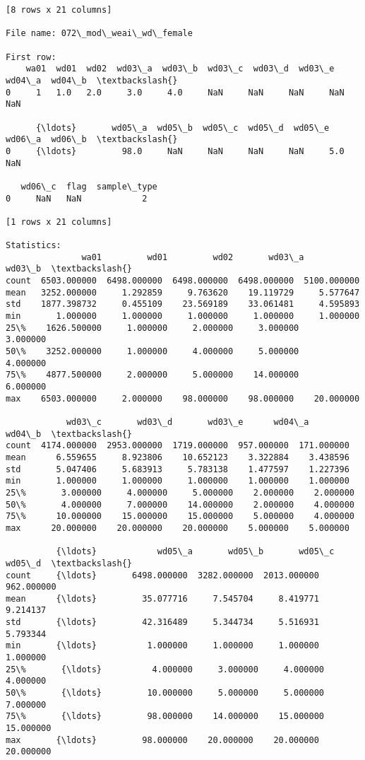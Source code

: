 \documentclass[11pt]{article}
\begin{document}
\begin{Verbatim}[commandchars=\\\{\}]
[8 rows x 21 columns]

File name: 072\_mod\_weai\_wd\_female

First row: 
    wa01  wd01  wd02  wd03\_a  wd03\_b  wd03\_c  wd03\_d  wd03\_e  wd04\_a  wd04\_b  \textbackslash{}
0     1   1.0   2.0     3.0     4.0     NaN     NaN     NaN     NaN     NaN   

      {\ldots}       wd05\_a  wd05\_b  wd05\_c  wd05\_d  wd05\_e  wd06\_a  wd06\_b  \textbackslash{}
0     {\ldots}         98.0     NaN     NaN     NaN     NaN     5.0     NaN   

   wd06\_c  flag  sample\_type  
0     NaN   NaN            2  

[1 rows x 21 columns]

Statistics: 
               wa01         wd01         wd02       wd03\_a       wd03\_b  \textbackslash{}
count  6503.000000  6498.000000  6498.000000  6498.000000  5100.000000   
mean   3252.000000     1.292859     9.763620    19.119729     5.577647   
std    1877.398732     0.455109    23.569189    33.061481     4.595893   
min       1.000000     1.000000     1.000000     1.000000     1.000000   
25\%    1626.500000     1.000000     2.000000     3.000000     3.000000   
50\%    3252.000000     1.000000     4.000000     5.000000     4.000000   
75\%    4877.500000     2.000000     5.000000    14.000000     6.000000   
max    6503.000000     2.000000    98.000000    98.000000    20.000000   

            wd03\_c       wd03\_d       wd03\_e      wd04\_a      wd04\_b  \textbackslash{}
count  4174.000000  2953.000000  1719.000000  957.000000  171.000000   
mean      6.559655     8.923806    10.652123    3.322884    3.438596   
std       5.047406     5.683913     5.783138    1.477597    1.227396   
min       1.000000     1.000000     1.000000    1.000000    1.000000   
25\%       3.000000     4.000000     5.000000    2.000000    2.000000   
50\%       4.000000     7.000000    14.000000    2.000000    4.000000   
75\%      10.000000    15.000000    15.000000    5.000000    4.000000   
max      20.000000    20.000000    20.000000    5.000000    5.000000   

          {\ldots}            wd05\_a       wd05\_b       wd05\_c      wd05\_d  \textbackslash{}
count     {\ldots}       6498.000000  3282.000000  2013.000000  962.000000   
mean      {\ldots}         35.077716     7.545704     8.419771    9.214137   
std       {\ldots}         42.316489     5.344734     5.516931    5.793344   
min       {\ldots}          1.000000     1.000000     1.000000    1.000000   
25\%       {\ldots}          4.000000     3.000000     4.000000    4.000000   
50\%       {\ldots}         10.000000     5.000000     5.000000    7.000000   
75\%       {\ldots}         98.000000    14.000000    15.000000   15.000000   
max       {\ldots}         98.000000    20.000000    20.000000   20.000000   


\end{Verbatim}
\end{document}
